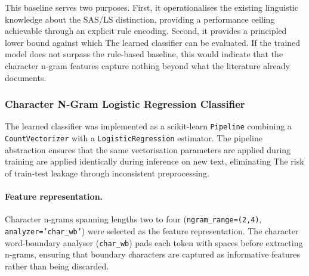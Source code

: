 \documentclass[12pt]{ThesisRU}
\begin{document}
This baseline serves two purposes. First, it operationalises the
existing linguistic knowledge about the SAS/LS distinction,
providing a performance ceiling achievable through an explicit rule
encoding. Second, it provides a principled lower bound against which
The learned classifier can be evaluated. If the trained model does
not surpass the rule-based baseline, this would indicate that the
character n-gram features capture nothing beyond what the literature
already documents.

\subsubsection{Character N-Gram Logistic Regression Classifier}
\label{sec:learned}

The learned classifier was implemented as a scikit-learn
\texttt{Pipeline} combining a \texttt{CountVectorizer} with a
\texttt{LogisticRegression} estimator. The pipeline abstraction
ensures that the same vectorisation parameters are applied during training
are applied identically during inference on new text, eliminating
The risk of train-test leakage through inconsistent preprocessing.

\paragraph{Feature representation.}
Character n-grams spanning lengths two to four
(\texttt{ngram\_range=(2,4)}, \texttt{analyzer='char\_wb'}) were
selected as the feature representation. The character word-boundary
analyser (\texttt{char\_wb}) pads each token with spaces before
extracting n-grams, ensuring that boundary characters are captured
as informative features rather than being discarded.
\end{document}
